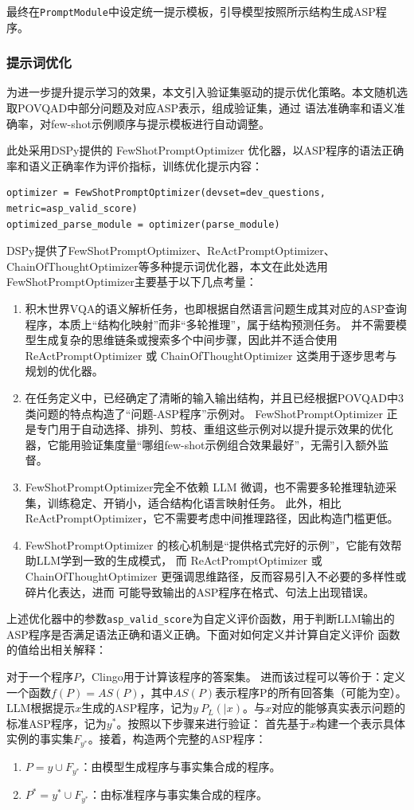 最终在\texttt{PromptModule}中设定统一提示模板，引导模型按照所示结构生成ASP程序。
\subsubsection{提示词优化}
为进一步提升提示学习的效果，本文引入验证集驱动的提示优化策略。本文随机选取POVQAD中部分问题及对应ASP表示，组成验证集，通过
语法准确率和语义准确率，对few-shot示例顺序与提示模板进行自动调整。

此处采用DSPy提供的 FewShotPromptOptimizer 优化器，以ASP程序的语法正确率和语义正确率作为评价指标，训练优化提示内容：
\begin{lstlisting}
optimizer = FewShotPromptOptimizer(devset=dev_questions, metric=asp_valid_score)
optimized_parse_module = optimizer(parse_module)
\end{lstlisting}

DSPy提供了FewShotPromptOptimizer、ReActPromptOptimizer、ChainOfThoughtOptimizer等多种提示词优化器，本文在此处选用
FewShotPromptOptimizer主要基于以下几点考量：
\begin{enumerate}[nosep]
\item 积木世界VQA的语义解析任务，也即根据自然语言问题生成其对应的ASP查询程序，本质上“结构化映射”而非“多轮推理”，属于结构预测任务。
并不需要模型生成复杂的思维链条或搜索多个中间步骤，因此并不适合使用 ReActPromptOptimizer 或 ChainOfThoughtOptimizer 这类用于逐步思考与规划的优化器。
\item 在任务定义中，已经确定了清晰的输入输出结构，并且已经根据POVQAD中3类问题的特点构造了“问题-ASP程序”示例对。
FewShotPromptOptimizer 正是专门用于自动选择、排列、剪枝、重组这些示例对以提升提示效果的优化器，它能用验证集度量“哪组few-shot示例组合效果最好”，无需引入额外监督。
\item FewShotPromptOptimizer完全不依赖 LLM 微调，也不需要多轮推理轨迹采集，训练稳定、开销小，适合结构化语言映射任务。
此外，相比 ReActPromptOptimizer，它不需要考虑中间推理路径，因此构造门槛更低。
\item FewShotPromptOptimizer 的核心机制是“提供格式完好的示例”，它能有效帮助LLM学到一致的生成模式，
而 ReActPromptOptimizer 或 ChainOfThoughtOptimizer 更强调思维路径，反而容易引入不必要的多样性或碎片化表达，进而
可能导致输出的ASP程序在格式、句法上出现错误。
\end{enumerate}

上述优化器中的参数\texttt{asp\_valid\_score}为自定义评价函数，用于判断LLM输出的ASP程序是否满足语法正确和语义正确。下面对如何定义并计算自定义评价
函数的值给出相关解释：

对于一个程序$P$，Clingo用于计算该程序的答案集。
进而该过程可以等价于：定义一个函数$f(P) = AS(P)$，其中$AS(P)$表示程序P的所有回答集（可能为空）。
LLM根据提示$x$生成的ASP程序，记为$y ~ P_L(|x)$。与$x$对应的能够真实表示问题的标准ASP程序，记为$y^*$。按照以下步骤来进行验证：
首先基于$x$构建一个表示具体实例的事实集$F_{y^*}$。接着，构造两个完整的ASP程序：
\begin{enumerate}[nosep]
\item $P = y \cup F_{y^*}$：由模型生成程序与事实集合成的程序。
\item $P^* = y^* \cup F_{y^*}$：由标准程序与事实集合成的程序。
\end{enumerate}

